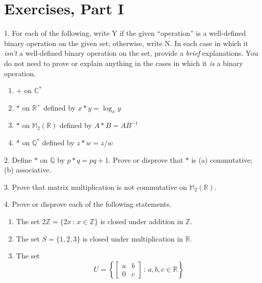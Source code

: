 \documentclass[10pt,openany,oneside]{book}
\theoremstyle{plain}
\theoremstyle{definition}
\theoremstyle{definition}
\theoremstyle{definition}
\theoremstyle{definition}
\numberwithin{equation}{section}
\def\Z{\mathbb{Z}}
\def\R{\mathbb{R}}
\def\Q{\mathbb{Q}}
\def\C{\mathbb{C}}
\def\M{\mathbb{M}}
\newcommand{\amp}{&}
\begin{document}
\section[{Exercises, Part I}]{Exercises, Part I}\label{exercises-2}
\begin{exerciselist}
\item[1.]\hypertarget{exercise-7}{}For each of the following, write Y if the given ``operation'' is a well-defined binary operation on the given set; otherwise, write N. In each case in which it \emph{isn't} a well-defined binary operation on the set, provide a \emph{brief} explanations. You do not need to prove or explain anything in the cases in which it \emph{is} a binary operation. \leavevmode%
\begin{enumerate}[label=(\alph*)]
\item\hypertarget{li-58}{}\(+\) on \(\C^*\)%
\item\hypertarget{li-59}{}\(*\) on \(\R^+\) defined by \(x*y=\log_x y\)%
\item\hypertarget{li-60}{}\(*\) on \(\M_2(\R)\) defined by \(A*B=AB^{-1}\)%
\item\hypertarget{li-61}{}\(*\) on \(\Q^*\) defined by \(z*w=z/w\)%
\end{enumerate}
%
\par\smallskip
\item[2.]\hypertarget{exercise-8}{}Define \(*\) on \(\Q\) by \(p*q=pq+1\). Prove or disprove that \(*\) is (a) commutative; (b) associative.%
\par\smallskip
\item[3.]\hypertarget{exercise-9}{}Prove that matrix multiplication is not commutative on \(\M_2(\R)\).%
\par\smallskip
\item[4.]\hypertarget{exercise-10}{}Prove or disprove each of the following statements. \leavevmode%
\begin{enumerate}[label=(\alph*)]
\item\hypertarget{li-68}{}The set \(2\Z=\{2x\,:\,x\in \Z\}\) is closed under addition in \(\Z\).%
\item\hypertarget{li-69}{}The set \(S=\{1,2,3\}\) is closed under multiplication in \(\R\).%
\item\hypertarget{li-70}{}The set%
\begin{equation*}
U=\left\{
\begin{bmatrix}
a    \amp    b\\
0 \amp c \end{bmatrix}\,:\,a,b,c\in \R\right\}

\end{equation*}
\end{enumerate}
\end{exerciselist}
\end{document}

